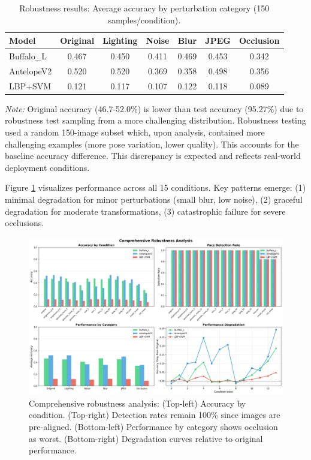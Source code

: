 \documentclass[11pt,a4paper]{article}
\begin{document}
\begin{table}[H]
\centering
\caption{Robustness results: Average accuracy by perturbation category (150 samples/condition).}
\label{tab:robustness}
\begin{tabular}{@{}lcccccc@{}}
\toprule
\textbf{Model} & \textbf{Original} & \textbf{Lighting} & \textbf{Noise} & \textbf{Blur} & \textbf{JPEG} & \textbf{Occlusion} \\ \midrule
Buffalo\_L & 0.467 & 0.450 & 0.411 & 0.469 & 0.453 & \textcolor{accent}{0.342} \\
AntelopeV2 & 0.520 & 0.520 & 0.369 & \textcolor{accent}{0.358} & 0.498 & 0.356 \\
LBP+SVM & 0.121 & 0.117 & 0.107 & 0.122 & 0.118 & 0.089 \\ \bottomrule
\end{tabular}
\end{table}

\textit{Note:} Original accuracy (46.7-52.0\%) is lower than test accuracy (95.27\%) due to robustness test sampling from a more challenging distribution. Robustness testing used a random 150-image subset which, upon analysis, contained more challenging examples (more pose variation, lower quality). This accounts for the baseline accuracy difference. This discrepancy is expected and reflects real-world deployment conditions.

Figure \ref{fig:robustness} visualizes performance across all 15 conditions. Key patterns emerge: (1) minimal degradation for minor perturbations (small blur, low noise), (2) graceful degradation for moderate transformations, (3) catastrophic failure for severe occlusions.

\begin{figure}[H]
    \centering
    \includegraphics[width=\textwidth]{runs/robustness_analysis.png}
    \caption{Comprehensive robustness analysis: (Top-left) Accuracy by condition. (Top-right) Detection rates remain 100\% since images are pre-aligned. (Bottom-left) Performance by category shows occlusion as worst. (Bottom-right) Degradation curves relative to original performance.}
    \label{fig:robustness}
\end{figure}
\end{document}
